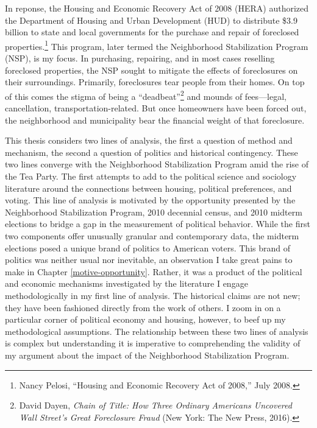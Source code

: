 \documentclass[12pt,oneside]{psthesis}
\begin{document}
In reponse, the Housing and Economic Recovery Act of 2008 (HERA) authorized the Department of Housing and Urban Development (HUD) to distribute \$3.9 billion to state and local governments for the purchase and repair of foreclosed properties.\footnote{Nancy Pelosi, ``Housing and Economic Recovery Act of 2008,'' July 2008.}
This program, later termed the Neighborhood Stabilization Program (NSP), is my focus.
In purchasing, repairing, and in most cases reselling foreclosed properties, the NSP sought to mitigate the effects of foreclosures on their surroundings.
Primarily, foreclosures tear people from their homes.
On top of this comes the stigma of being a ``deadbeat''\footnote{David Dayen, \emph{Chain of Title: How Three Ordinary Americans Uncovered Wall Street's Great Foreclosure Fraud} (New York: The New Press, 2016).} and mounds of fees---legal, cancellation, transportation-related.
But once homeowners have been forced out, the neighborhood and municipality bear the financial weight of that foreclosure.

This thesis considers two lines of analysis, the first a question of method and mechanism, the second a question of politics and historical contingency.
These two lines converge with the Neighborhood Stabilization Program amid the rise of the Tea Party.
The first attempts to add to the political science and sociology literature around the connections between housing, political preferences, and voting.
This line of analysis is motivated by the opportunity presented by the Neighborhood Stabilization Program, 2010 decennial census, and 2010 midterm elections to bridge a gap in the measurement of political behavior.
While the first two components offer unusually granular and contemporary data, the midterm elections posed a unique brand of politics to American voters.
This brand of politics was neither usual nor inevitable, an observation I take great pains to make in Chapter \ref{motive-opportunity}.
Rather, it was a product of the political and economic mechanisms investigated by the literature I engage methodologically in my first line of analysis.
The historical claims are not new; they have been fashioned directly from the work of others.
I zoom in on a particular corner of political economy and housing, however, to beef up my methodological assumptions.
The relationship between these two lines of analysis is complex but understanding it is imperative to comprehending the validity of my argument about the impact of the Neighborhood Stabilization Program.
\end{document}
